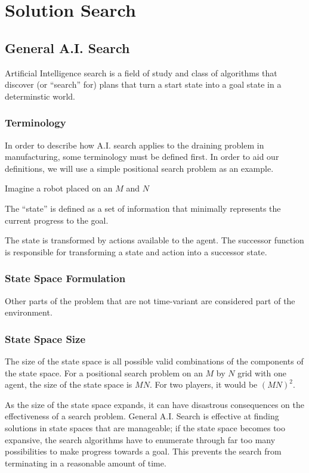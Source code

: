 								\chapter{Solution Search}

\section{General A.I. Search}

Artificial Intelligence search is a field of study and class of algorithms that discover (or ``search'' for) plans that turn a start state into a goal state in a determinstic world.

	\subsection{Terminology}

In order to describe how A.I. search applies to the draining problem in manufacturing, some terminology must be defined first. In order to aid our definitions, we will use a simple positional search problem as an example.

Imagine a robot placed on an $M$ and $N$

The ``state'' is defined as a set of information that minimally represents the current progress to the goal.

 The state is transformed by actions available to the agent. The successor function is responsible for transforming a state and action into a successor state.


	\subsection{State Space Formulation}


Other parts of the problem that are not time-variant are considered part of the environment.

	\subsection{State Space Size}
The size of the state space is all possible valid combinations of the components of the state space. For a positional search problem on an $M$ by $N$ grid with one agent, the size of the state space is $MN$. For two players, it would be $(MN)^2$.

As the size of the state space expands, it can have disastrous consequences on the effectiveness of a search problem. General A.I. Search is effective at finding solutions in state spaces that are manageable; if the state space becomes too expansive, the search algorithms have to enumerate through far too many possibilities to make progress towards a goal. This prevents the search from terminating in a reasonable amount of time.

